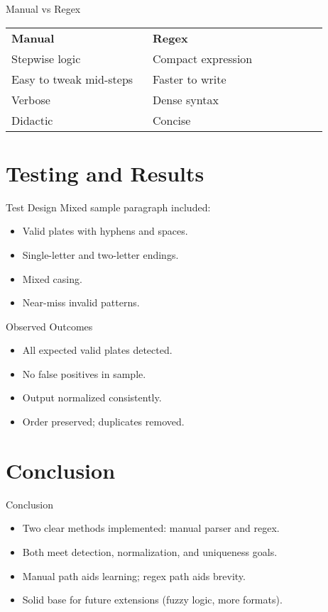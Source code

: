 \documentclass[aspectratio=169]{beamer}
\begin{document}
\begin{frame}{Manual vs Regex}
  \begin{tabular}{p{0.42\linewidth} p{0.52\linewidth}}
    \textbf{Manual} & \textbf{Regex} \\
    Stepwise logic & Compact expression \\
    Easy to tweak mid-steps & Faster to write \\
    Verbose & Dense syntax \\
    Didactic & Concise \\
  \end{tabular}
\end{frame}

\section{Testing and Results}

\begin{frame}{Test Design}
  Mixed sample paragraph included:
  \begin{itemize}
    \item Valid plates with hyphens and spaces.
    \item Single-letter and two-letter endings.
    \item Mixed casing.
    \item Near-miss invalid patterns.
  \end{itemize}
\end{frame}

\begin{frame}{Observed Outcomes}
  \begin{itemize}
    \item All expected valid plates detected.
    \item No false positives in sample.
    \item Output normalized consistently.
    \item Order preserved; duplicates removed.
  \end{itemize}
\end{frame}

\section{Conclusion}

\begin{frame}{Conclusion}
  \begin{itemize}
    \item Two clear methods implemented: manual parser and regex.
    \item Both meet detection, normalization, and uniqueness goals.
    \item Manual path aids learning; regex path aids brevity.
    \item Solid base for future extensions (fuzzy logic, more formats).
  \end{itemize}
\end{frame}
\end{document}
